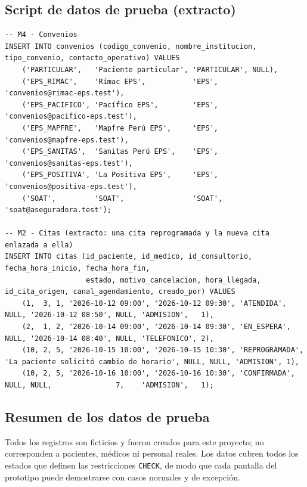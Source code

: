 \documentclass[11pt,a4paper]{article}
\begin{document}
\subsection{Script de datos de prueba (extracto)}

\begin{lstlisting}[style=sql, caption={Script de inserción de datos de prueba (extracto de \texttt{02-datos-prueba.sql})}, label={lst:inserts}]
-- M4 - Convenios
INSERT INTO convenios (codigo_convenio, nombre_institucion, tipo_convenio, contacto_operativo) VALUES
    ('PARTICULAR',   'Paciente particular', 'PARTICULAR', NULL),
    ('EPS_RIMAC',    'Rímac EPS',           'EPS',        'convenios@rimac-eps.test'),
    ('EPS_PACIFICO', 'Pacífico EPS',        'EPS',        'convenios@pacifico-eps.test'),
    ('EPS_MAPFRE',   'Mapfre Perú EPS',     'EPS',        'convenios@mapfre-eps.test'),
    ('EPS_SANITAS',  'Sanitas Perú EPS',    'EPS',        'convenios@sanitas-eps.test'),
    ('EPS_POSITIVA', 'La Positiva EPS',     'EPS',        'convenios@positiva-eps.test'),
    ('SOAT',         'SOAT',                'SOAT',       'soat@aseguradora.test');

-- M2 - Citas (extracto: una cita reprogramada y la nueva cita enlazada a ella)
INSERT INTO citas (id_paciente, id_medico, id_consultorio, fecha_hora_inicio, fecha_hora_fin,
                   estado, motivo_cancelacion, hora_llegada, id_cita_origen, canal_agendamiento, creado_por) VALUES
    (1,  3, 1, '2026-10-12 09:00', '2026-10-12 09:30', 'ATENDIDA',     NULL, '2026-10-12 08:50', NULL, 'ADMISION',   1),
    (2,  1, 2, '2026-10-14 09:00', '2026-10-14 09:30', 'EN_ESPERA',    NULL, '2026-10-14 08:40', NULL, 'TELEFONICO', 2),
    (10, 2, 5, '2026-10-15 10:00', '2026-10-15 10:30', 'REPROGRAMADA', 'La paciente solicitó cambio de horario', NULL, NULL, 'ADMISION', 1),
    (10, 2, 5, '2026-10-16 10:00', '2026-10-16 10:30', 'CONFIRMADA',   NULL, NULL,               7,    'ADMISION',   1);
\end{lstlisting}

\subsection{Resumen de los datos de prueba}

Todos los registros son ficticios y fueron creados para este proyecto; no corresponden a
pacientes, médicos ni personal reales. Los datos cubren todos los estados que definen las
restricciones \texttt{CHECK}, de modo que cada pantalla del prototipo puede demostrarse con
casos normales y de excepción.
\end{document}
